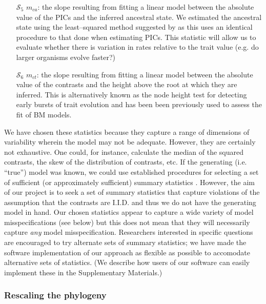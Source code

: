 \documentclass[12pt]{article}
\begin{document}
\begin{enumerate}
\item[$\mathcal{S}_5$] $m_{ca}$: the slope resulting from fitting a linear model between the absolute value of the PICs and the inferred ancestral state. We estimated the ancestral state using the least--squared method suggested by \citep{Felsenstein1985} as this uses an identical procedure to that done when estimating PICs. This statistic will allow us to evaluate whether there is variation in rates relative to the trait value (e.g. do larger organisms evolve faster?) \citep{Garlandetal1992}

\item[$\mathcal{S}_6$] $m_{ct}$: the slope resulting from fitting a linear model between the absolute value of the contrasts and the height above the root at which they are inferred. This is alternatively known as the node height test \citep{FreckletonHarvey2006, SlaterPennell} for detecting early bursts of trait evolution and has been been previously used to assess the fit of BM models. \citep{Garlandetal1992}
\end{enumerate}

We have chosen these statistics because they capture a range of dimensions of variability wherein the model may not be adequate. However, they are certainly not exhaustive. One could, for instance, calculate the median of the squared contrasts, the skew of the distribution of contrasts, etc. If the generating (i.e. ``true'') model was known, we could use established procedures for selecting a set of sufficient (or approximately sufficient) summary statistics \citep[e.g.][]{MajoramJoyce, Wegmann2010}. However, the aim of our project is to seek a set of summary statistics that capture violations of the assumption that the contrasts are I.I.D. and thus we do not have the generating model in hand. Our chosen statistics appear to capture a wide variety of model misspecifications (see below) but this does not mean that they will necessarily capture \textit{any} model misspecification. Researchers interested in specific questions are encouraged to try alternate sets of summary statistics; we have made the software implementation of our approach as flexible as possible to accomodate alternative sets of statistics. (We describe how users of our software can easily implement these in the Supplementary Materials.)

\subsubsection{Rescaling the phylogeny}
\end{document}
